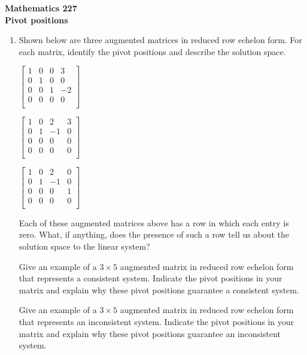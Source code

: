 \documentclass[12pt]{article}
\newcommand{\vs}[1]{\vspace{#1in}}
\begin{document}
\noindent
{\bf Mathematics 227} \\ 
{\bf Pivot positions}

\bigskip
\begin{enumerate}
\item Shown below are three augmented matrices in reduced row echelon
  form.  For each matrix, identify the pivot positions and describe
  the solution space.

  $
  \left[
    \begin{array}{rrr|r}
      1 & 0 & 0 & 3 \\
      0 & 1 & 0 & 0 \\
      0 & 0 & 1 & -2 \\
      0 & 0 & 0 & 0 \\
    \end{array}
  \right]
  $

  \bigskip
  $
  \left[
    \begin{array}{rrr|r}
      1 & 0 & 2 & 3 \\
      0 & 1 & -1 & 0 \\
      0 & 0 & 0 & 0 \\
      0 & 0 & 0 & 0 \\
    \end{array}
  \right]
  $

  \bigskip
  $
  \left[
    \begin{array}{rrr|r}
      1 & 0 & 2 & 0 \\
      0 & 1 & -1 & 0 \\
      0 & 0 & 0 & 1 \\
      0 & 0 & 0 & 0 \\
    \end{array}
  \right]
  $

  Each of these augmented matrices above has a row in
  which each entry is zero.  What, if anything, does the
  presence of such a row tell us about the solution space to the
  linear system?

  \vs{1}
  Give an example of a $3\times5$ augmented matrix
  in reduced row echelon form that represents a consistent
  system.  Indicate the pivot positions in your matrix and
  explain why these pivot positions guarantee a consistent
  system.

  \vs{1.5}

  \newpage
  Give an example of a $3\times5$ augmented matrix in
  reduced row echelon form that represents an inconsistent
  system.  Indicate the pivot positions in your matrix and
  explain why these pivot positions guarantee an inconsistent
  system.


\end{enumerate}
\end{document}
